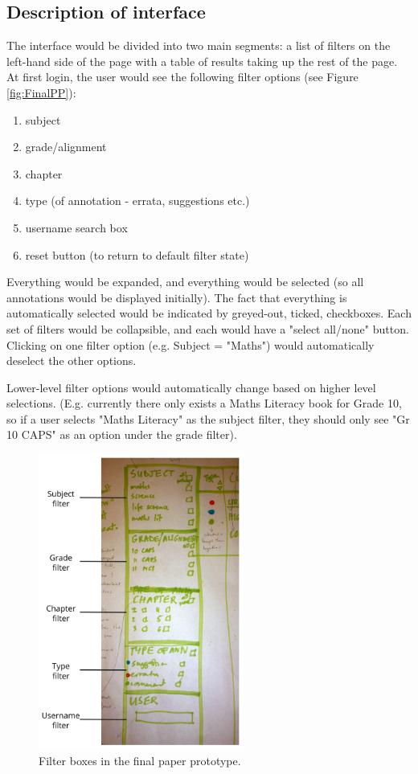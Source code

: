 \subsection{Description of interface}
The interface would be divided into two main segments: a list of filters on the left-hand side of the page with a table of results taking up the rest of the page. At first login, the user would see the following filter options (see Figure \ref{fig:FinalPP}):
\begin{enumerate}
 \item subject
 \item grade/alignment 
 \item chapter
 \item type (of annotation - errata, suggestions etc.)
 \item username search box
 \item reset button (to return to default filter state)
\end{enumerate}

Everything would be expanded, and everything would be selected (so all annotations would be displayed initially). The fact that everything is automatically selected would be indicated by greyed-out, ticked, checkboxes. Each set of filters would be collapsible, and each would have a "select all/none" button. Clicking on one filter option (e.g. Subject = "Maths") would automatically deselect the other options. 

Lower-level filter options would automatically change based on higher level selections. (E.g. currently there only exists a Maths Literacy book for Grade 10, so if a user selects "Maths Literacy" as the subject filter, they should only see "Gr 10 CAPS" as an option under the grade filter). 

\begin{figure}[h!]
    \centering
    \includegraphics[width=0.6\textwidth]{Figures/forweb/PDfiltersLabelssmall.png}
 \caption{Filter boxes in the final paper prototype.}
 \label{fig:FilterBoxes}
\end{figure}

